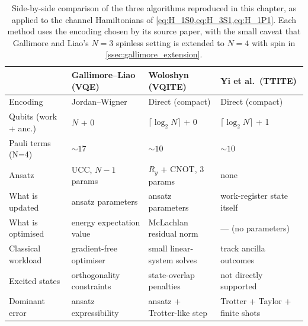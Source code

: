 \begin{table}[htbp]
\centering
\caption{Side-by-side comparison of the three algorithms reproduced in
  this chapter, as applied to the channel Hamiltonians of
  \cref{eq:H_1S0,eq:H_3S1,eq:H_1P1}. Each method uses the encoding chosen
  by its source paper, with the small caveat that Gallimore and Liao's
  $N=3$ spinless setting is extended to $N=4$ with spin in
  \cref{ssec:gallimore_extension}.}
\label{tab:algo_compare}
\renewcommand{\arraystretch}{1.15}
\begin{tabular}{p{}p{}p{}p{}}
\toprule
                 & Gallimore--Liao (VQE)         & Woloshyn (VQITE)               & Yi et al.\ (TTITE)             \\
\midrule
Encoding         & Jordan--Wigner                 & Direct (compact)               & Direct (compact)               \\[2pt]
Qubits (work + anc.) & $N$ + 0                    & $\lceil\log_2 N\rceil$ + 0     & $\lceil\log_2 N\rceil$ + 1     \\[2pt]
Pauli terms (N=4) & $\sim 17$                     & $\sim 10$                      & $\sim 10$                      \\[2pt]
Ansatz           & UCC, $N{-}1$ params            & $R_y$ + CNOT, $3$ params       & none                            \\[2pt]
What is updated  & ansatz parameters              & ansatz parameters              & work-register state itself     \\[2pt]
What is optimised& energy expectation value       & McLachlan residual norm        & --- (no parameters)            \\[2pt]
Classical workload & gradient-free optimiser      & small linear-system solves     & track ancilla outcomes         \\[2pt]
Excited states     & orthogonality constraints    & state-overlap penalties        & not directly supported         \\[2pt]
Dominant error     & ansatz expressibility        & ansatz + Trotter-like step     & Trotter + Taylor + finite shots\\
\bottomrule
\end{tabular}
\end{table}

